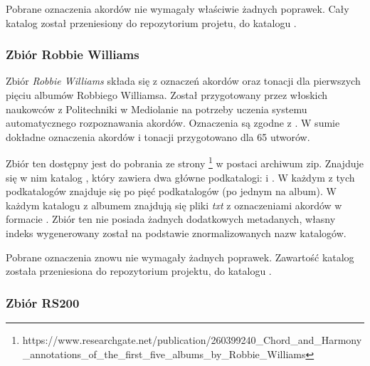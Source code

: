 Pobrane oznaczenia akordów nie wymagały właściwie żadnych poprawek. Cały katalog
 został przeniesiony do repozytorium projetu, do katalogu
.

\subsubsection{Zbiór Robbie Williams}

Zbiór \emph{Robbie Williams} \cite{giorgi_automatic_2013} składa się z oznaczeń akordów oraz tonacji
dla pierwszych pięciu albumów Robbiego Williamsa. Został przygotowany przez włoskich naukowców z
Politechniki w Mediolanie na potrzeby uczenia systemu automatycznego rozpoznawania akordów.
Oznaczenia są zgodne z \cite{harte_towards_nodate}. W sumie dokładne oznaczenia akordów i tonacji
przygotowano dla 65 utworów.

Zbiór ten dostępny jest do pobrania ze strony
\footnote{https://www.researchgate.net/publication/260399240\_Chord\_and\_Harmony\_annotations\_of\_the\_first\_five\_albums\_by\_Robbie\_Williams}
w postaci archiwum zip. Znajduje się w nim katalog , który zawiera
dwa główne podkatalogi:  i . W każdym z tych podkatalogów znajduje się po pięć
podkatalogów (po jednym na album). W każdym katalogu z albumem znajdują się pliki \emph{txt} z
oznaczeniami akordów w formacie . Zbiór ten nie posiada żadnych dodatkowych metadanych,
własny indeks wygenerowany został na podstawie znormalizowanych nazw katalogów.

Pobrane oznaczenia znowu nie wymagały żadnych poprawek. Zawartość katalog
 została przeniesiona do repozytorium projektu, do katalogu
.

\subsubsection{Zbiór RS200}

